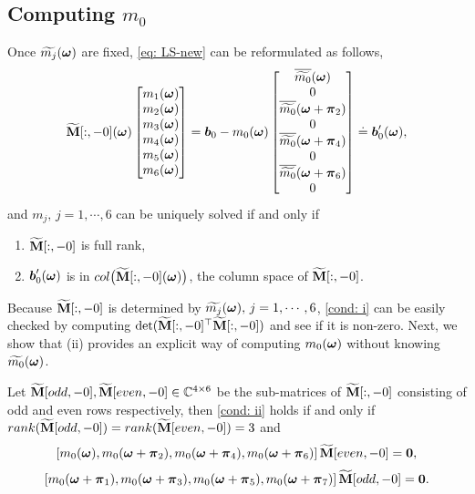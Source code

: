 \subsection{Computing $m_0$}\label{subsec: compute-m0}
Once $\widetilde{m_{j}}(\boldsymbol{\omega})$ are fixed, \eqref{eq: LS-new} can be reformulated as follows,
\begin{align*}
\widetilde{\mathbf{M}}[:,-0](\boldsymbol{\omega}) 
\begin{bmatrix}
m_1(\boldsymbol{\omega})\\
m_2(\boldsymbol{\omega})\\
m_3(\boldsymbol{\omega})\\
m_4(\boldsymbol{\omega})\\
m_5(\boldsymbol{\omega})\\
m_6(\boldsymbol{\omega})
\end{bmatrix}
= \boldsymbol{b}_0 - m_0(\boldsymbol{\omega})
\begin{bmatrix}
 \overline{\widetilde{m_0}}(\boldsymbol{\omega})\\
 0\\
\overline{\widetilde{m_{0}}}(\boldsymbol{\omega} + \boldsymbol{\pi}_{2})\\
0\\
\overline{\widetilde{m_{0}}}(\boldsymbol{\omega} + \boldsymbol{\pi}_{4})\\
0\\
\overline{\widetilde{m_{0}}}(\boldsymbol{\omega} + \boldsymbol{\pi}_{6})\\
0
\end{bmatrix} \doteq \boldsymbol{b}_0'(\boldsymbol{\omega}),
\end{align*}
and $m_j,\,j=1,\cdots,6$ can be uniquely solved if and only if
\hspace{-1em}
\begin{enumerate}[leftmargin=.5in]
\item[\mylabel{cond: i}{(\ref{subsec: compute-m0}.i)}] $\widetilde{\mathbf{M}}[:,-0]$ is full rank,%
\item[\mylabel{cond: ii}{(\ref{subsec: compute-m0}.ii)}] $\boldsymbol{b}_0'(\boldsymbol{\omega})$ is in $col\big(\widetilde{\mathbf{M}}[:,-0](\boldsymbol{\omega})\big)$, the column space of $\widetilde{\mathbf{M}}[:,-0]$.%
\end{enumerate}
Because $\widetilde{\mathbf{M}}[:,-0]$ is determined by $\widetilde{m_{j}}(\boldsymbol{\omega}),\,j = 1,\cdots,6$, \ref{cond: i} can be easily checked by computing $\det(\widetilde{\mathbf{M}}[:,-0]^\top\widetilde{\mathbf{M}}[:,-0])$ and see if it is non-zero. Next, we show that (ii) provides an explicit way of computing $m_0(\boldsymbol{\omega})$ without knowing $\widetilde{m_{0}}(\boldsymbol{\omega})$.
\begin{proposition}\label{prop: m0_formula}
Let $\widetilde{\mathbf{M}}[odd,-0],\widetilde{\mathbf{M}}[even,-0]\in\mathbb{C}^{4\times6}$ be the sub-matrices of $\widetilde{\mathbf{M}}[:,-0]$ consisting of odd and even rows respectively, then \ref{cond: ii} holds if and only if $rank(\widetilde{\mathbf{M}}[odd,-0]) = rank(\widetilde{\mathbf{M}}[even,-0]) = 3$ and 
\begin{align}\label{eq: m0-even-null}
[m_0(\boldsymbol{\omega}),m_0(\boldsymbol{\omega}+\boldsymbol{\pi}_2), m_0(\boldsymbol{\omega} +\boldsymbol{\pi}_4), m_0(\boldsymbol{\omega}+\boldsymbol{\pi}_6)]\, \widetilde{\mathbf{M}}[even,-0] = \boldsymbol{0},
\end{align}
\begin{align}\label{eq: m0-odd-null}
[m_0(\boldsymbol{\omega}+\boldsymbol{\pi}_1),m_0(\boldsymbol{\omega}+\boldsymbol{\pi}_3), m_0(\boldsymbol{\omega} +\boldsymbol{\pi}_5), m_0(\boldsymbol{\omega}+\boldsymbol{\pi}_7)] \,\widetilde{\mathbf{M}}[odd,-0] = \boldsymbol{0}.
\end{align}
\end{proposition}
